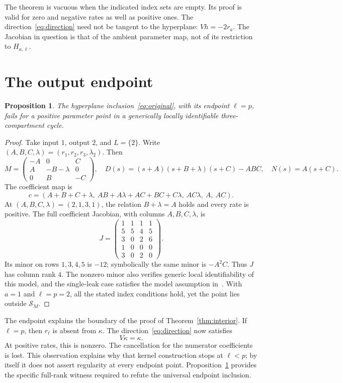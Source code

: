 \documentclass[11pt]{article}
\newtheorem{proposition}[theorem]{Proposition}
\begin{document}
The theorem is vacuous when the indicated index sets are empty. Its proof is valid for zero and negative rates as well as positive ones. The direction~\eqref{eq:direction} need not be tangent to the hyperplane: \(Vh=-2r_a\). The Jacobian in question is that of the ambient parameter map, not of its restriction to \(H_{a,\ell}\).

\section{The output endpoint}
\begin{proposition}\label{prop:endpoint}
The hyperplane inclusion~\eqref{eq:original}, with its endpoint \(\ell=p\), fails for a positive parameter point in a generically locally identifiable three-compartment cycle.
\end{proposition}
\begin{proof}
Take input \(1\), output \(2\), and \(L=\{2\}\). Write
\((A,B,C,\lambda)=(r_1,r_2,r_3,\lambda_2)\). Then
\[
 M=\begin{pmatrix}-A&0&C\\ A&-B-\lambda&0\\0&B&-C\end{pmatrix},
 \quad D(s)=(s+A)(s+B+\lambda)(s+C)-ABC,\quad
 N(s)=A(s+C).
\]
The coefficient map is
\[
 c=(A+B+C+\lambda,\ AB+A\lambda+AC+BC+C\lambda,\
       AC\lambda,\ A,\ AC).
\]
At \((A,B,C,\lambda)=(2,1,3,1)\), the relation \(B+\lambda=A\) holds and every rate is positive. The full coefficient Jacobian, with columns \(A,B,C,\lambda\), is
\[
 J=\begin{pmatrix}
 1&1&1&1\\5&5&4&5\\3&0&2&6\\1&0&0&0\\3&0&2&0
 \end{pmatrix}.
\]
Its minor on rows \(1,3,4,5\) is \(-12\); symbolically the same minor is \(-A^2C\). Thus \(J\) has column rank \(4\). The nonzero minor also verifies generic local identifiability of this model, and the single-leak case satisfies the model assumption in~\cite{Ahmed}. With \(a=1\) and \(\ell=p=2\), all the stated index conditions hold, yet the point lies outside \(\mathcal S_M\).
\end{proof}

The endpoint explains the boundary of the proof of Theorem~\ref{thm:interior}. If \(\ell=p\), then \(r_\ell\) is absent from \(\kappa\). The direction~\eqref{eq:direction} now satisfies
\[
 V\kappa=\kappa.
\]
At positive rates, this is nonzero. The cancellation for the numerator coefficients is lost. This observation explains why that kernel construction stops at \(\ell<p\); by itself it does not assert regularity at every endpoint point. Proposition~\ref{prop:endpoint} provides the specific full-rank witness required to refute the universal endpoint inclusion.
\end{document}
